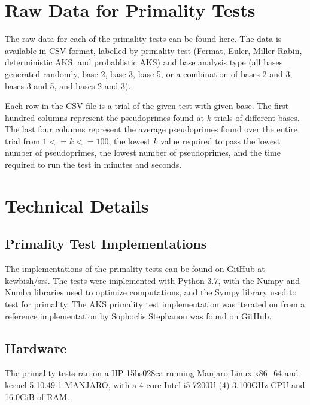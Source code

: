 \documentclass{article}
\begin{document}
\appendix
\begin{appendices}
\section{Raw Data for Primality Tests} \label{appendix:data}

The raw data for each of the primality tests can be found \href{https://github.com/kewbish/srs/tree/master/scripts/dataset}{here}. %
The data is available in CSV format, labelled by primality test (Fermat, Euler, Miller-Rabin, deterministic AKS, and probablistic AKS) and base analysis type (all bases generated randomly, base 2, base 3, base 5, or a combination of bases 2 and 3, bases 3 and 5, and bases 2 and 3).

Each row in the CSV file is a trial of the given test with given base. The first hundred columns represent the pseudoprimes found at $k$ trials of different bases. The last four columns represent the average pseudoprimes found over the entire trial from $1 <= k <= 100$, the lowest $k$ value required to pass the lowest number of pseudoprimes, the lowest number of pseudoprimes, and the time required to run the test in minutes and seconds. 

\section{Technical Details} \label{appendix:tech}

\subsection{Primality Test Implementations}
The implementations of the primality tests can be found on GitHub at kewbish/srs. %
The tests were implemented with Python 3.7, with the Numpy and Numba libraries used to optimize computations, and the Sympy library used to test for primality.
The AKS primality test implementation was iterated on from a reference implementation by Sophoclis Stephanou was found on GitHub. %

\subsection{Hardware}
The primality tests ran on a HP-15bs028ca running Manjaro Linux x86\_64 and kernel 5.10.49-1-MANJARO, with a 4-core Intel i5-7200U (4) 3.100GHz CPU and 16.0GiB of RAM.

\end{appendices}
\end{document}
